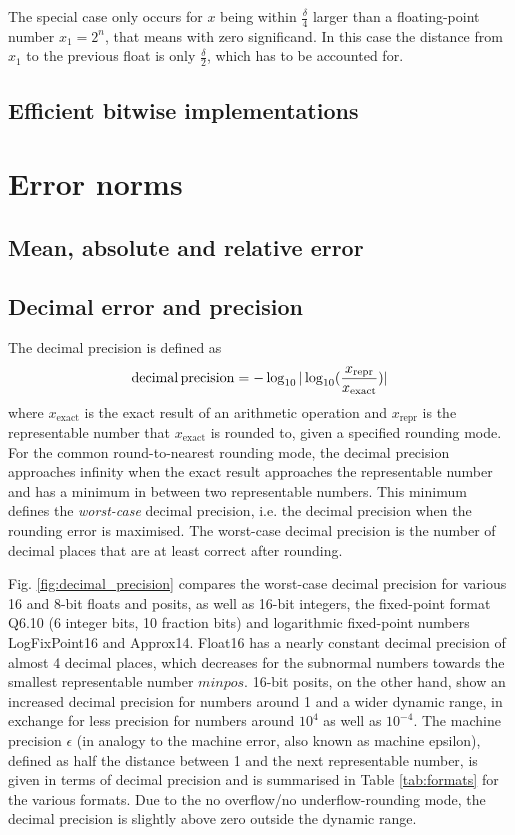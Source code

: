 The special case only occurs for $x$ being within $\tfrac{\delta}{4}$ larger than a floating-point number $x_1 = 2^n$, that means with zero significand.
In this case the distance from $x_1$ to the previous float is only $\tfrac{\delta}{2}$, which has to be accounted for.


\subsection{Efficient bitwise implementations}
\label{sec:bitwiseop}

\section{Error norms}
\label{sec:error_norms}

\subsection{Mean, absolute and relative error}
	
\subsection{Decimal error and precision}

The decimal precision is defined as \citep{Gustafson2017,Gustafson2017a}
\begin{equation}
\operatorname{decimal} \operatorname{precision} = -\log_{10} \vert \log_{10}( \frac{x_\text{repr}}{x_\text{exact}} ) \vert
\end{equation}
where $x_\text{exact}$ is the exact result of an arithmetic operation and $x_\text{repr}$ is the representable number
that $x_\text{exact}$ is rounded to, given a specified rounding mode. For the common round-to-nearest rounding mode,
the decimal precision approaches infinity when the exact result approaches the representable number and has a minimum
in between two representable numbers. This minimum defines the \emph{worst-case} decimal precision, i.e. the decimal
precision when the rounding error is maximised. The worst-case decimal precision is the number of decimal places that
are at least correct after rounding.

Fig. \ref{fig:decimal_precision} compares the worst-case decimal precision for various 16 and 8-bit floats and posits,
as well as 16-bit integers, the fixed-point format Q6.10 (6 integer bits, 10 fraction bits) and logarithmic fixed-point numbers
LogFixPoint16 and Approx14. Float16 has a nearly constant decimal precision of almost 4 decimal places, which decreases
for the subnormal numbers towards the smallest representable number $minpos$. 16-bit posits, on the other hand, show an
increased decimal precision for numbers around 1 and a wider dynamic range, in exchange for less precision for numbers
around $10^4$ as well as $10^{-4}$.  The machine precision $\epsilon$ (in analogy to the machine error, also known as
machine epsilon), defined as half the distance between 1 and the next representable number, is given in terms of decimal
precision and is summarised in Table \ref{tab:formats} for the various formats. Due to the no overflow/no underflow-rounding
mode, the decimal precision is slightly above zero outside the dynamic range.

